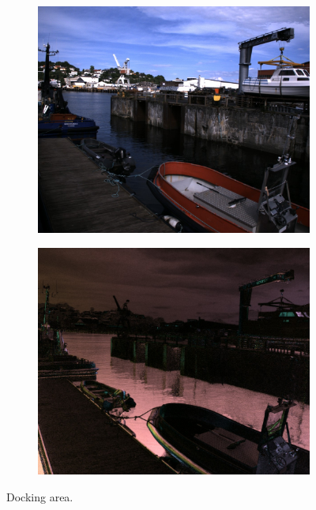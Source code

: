\begin{figure}[H]
    \begin{subfigure}[T]{.49\textwidth}
        \includegraphics[width=\textwidth]{figures/pictures/img_2790_s0.jpg}
    \end{subfigure} \hfill
    \begin{subfigure}[T]{.49\textwidth}
        \includegraphics[width=\textwidth]{figures/pictures/img_2790_pol.jpg}
    \end{subfigure}
    \caption{Docking area.}
\end{figure}
\vspace{-.5cm}

